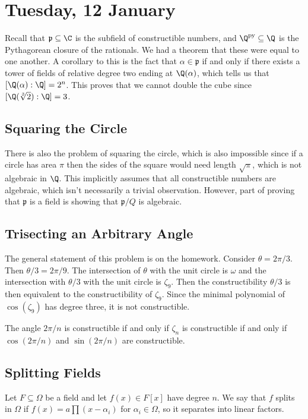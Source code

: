 
\section{Tuesday, 12 January}

Recall that $\mathfrak{p} \subseteq \C$ is the subfield of constructible numbers, and $\Q^{\mathrm{py}} \subseteq \Q$ is the Pythagorean closure of the rationals. We had a theorem that these were equal to one another. A corollary to this is the fact that $\alpha \in \mathfrak{p}$ if and only if there exists a tower of fields of relative degree two ending at $\Q(\alpha)$, which tells us that $[\Q(\alpha) : \Q] = 2^n$. This proves that we cannot double the cube since $[\Q(\sqrt[3]{2}) : \Q] = 3$.

\subsection{Squaring the Circle}
There is also the problem of squaring the circle, which is also impossible since if a circle has area $\pi$ then the sides of the square would need length $\sqrt{\pi}$, which is not algebraic in $\Q$. This implicitly assumes that all constructible numbers are algebraic, which isn't necessarily a trivial observation. However, part of proving that $\mathfrak{p}$ is a field is showing that $\mathfrak{p}/Q$ is algebraic.

\subsection{Trisecting an Arbitrary Angle}
The general statement of this problem is on the homework. Consider $\theta = 2\pi/3$. Then $\theta/3 = 2\pi/9$. The intersection of $\theta$ with the unit circle is $\omega$ and the intersection with $\theta/3$ with the unit circle is $\zeta_9$. Then the constructibility $\theta/3$ is then equivalent to the constructibility of $\zeta_9$. Since the minimal polynomial of $\cos(\zeta_9)$ has degree three, it is not constructible.

\begin{lemma}
The angle $2\pi/n$ is constructible if and only if $\zeta_n$ is constructible if and only if $\cos(2\pi/n)$ and $\sin(2\pi/n)$ are constructible.
\end{lemma}

\subsection{Splitting Fields}
Let $F \subseteq \Omega$ be a field and let $f(x) \in F[x]$ have degree $n$. We say that $f$ splits in $\Omega$ if $f(x) = a \prod (x-\alpha_i)$ for $\alpha_i \in \Omega$, so it separates into linear factors.

